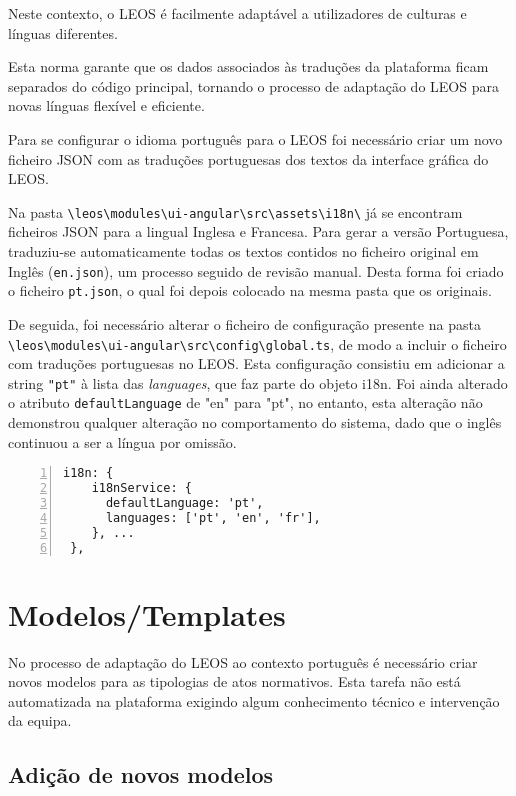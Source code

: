 Neste contexto, o LEOS é facilmente adaptável a utilizadores de culturas e línguas diferentes. 

Esta norma garante que os dados associados às traduções da plataforma ficam separados do código principal, 
tornando o processo de adaptação do LEOS para novas línguas flexível e eficiente.

Para se configurar o idioma português para o LEOS foi necessário criar um novo ficheiro JSON com as traduções portuguesas dos 
textos da interface gráfica do LEOS. 

Na pasta \verb|\leos\modules\ui-angular\src\assets\i18n\| já se encontram ficheiros JSON para a lingual Inglesa e Francesa. 
Para gerar a versão Portuguesa, traduziu-se automaticamente todas os textos contidos no ficheiro original em Inglês 
(\texttt{en.json}), 
um processo seguido de revisão manual. 
Desta forma foi criado o ficheiro \texttt{pt.json}, o qual foi depois colocado na mesma pasta que os originais.

De seguida, foi necessário alterar o ficheiro de configuração presente na pasta \\
\verb|\leos\modules\ui-angular\src\config\global.ts|, de modo a incluir o ficheiro com traduções portuguesas no LEOS. 
Esta configuração consistiu em adicionar a string \texttt{"pt"} à lista das \emph{languages}, que faz parte do objeto i18n. 
Foi ainda alterado o atributo \texttt{defaultLanguage} de "en" para "pt", no entanto, esta alteração não demonstrou qualquer 
alteração no comportamento do sistema, dado que o inglês continuou a ser a língua por omissão.

\begin{Verbatim}[frame=single, numbers=left, fontsize=\scriptsize]
i18n: {
    i18nService: {
      defaultLanguage: 'pt',
      languages: ['pt', 'en', 'fr'],
    }, ... 
 },
\end{Verbatim}


\section{Modelos/Templates}

No processo de adaptação do LEOS ao contexto português é necessário criar novos modelos para as tipologias de atos 
normativos. Esta tarefa não está automatizada na plataforma exigindo algum conhecimento técnico e intervenção da equipa.

\subsection{Adição de novos modelos}

